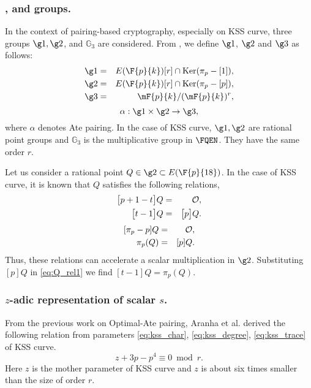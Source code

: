 \subsubsection{,  and  groups.} In the context of pairing-based cryptography, especially on KSS curve, three groups $\g1, \g2$, and $\mathbb{G}_3$ are considered. From \cite{PAIRING:MANS13}, we define $\g1$, $\g2$ and $\g3$ as follows:
\begin{eqnarray}\label{eq:g1}
\g1 & = &  E(\F{p}{k}) [r] \cap \text{Ker}(\pi_p - [1]), \nonumber \\
\g2 & = &  E(\F{p}{k}) [r] \cap \text{Ker}(\pi_p - [p]), \nonumber \\
\g3 & = & \mF{p}{k}/(\mF{p}{k})^r, \nonumber
\end{eqnarray}
\begin{equation}
\alpha : \g1 \times \g2 \rightarrow \g3,
\end{equation}
where $\alpha$ denotes Ate pairing. In the case of KSS curve, $\g1, \g2$ are rational point groups and $\mathbb{G}_3$ is the multiplicative group in $\FQEN$. They have the same order $r$. 

Let us consider a rational point $Q\in \g2 \subset E(\F{p}{18})$.
In the case of KSS curve, it is known that $Q$ satisfies the following relations,
\begin{eqnarray}\label{eq:Q_rel1}
\big[p+1-t\big]Q & = & \cal O, \nonumber \\
\big[t-1\big]Q  & = & \big[p\big]Q.
\end{eqnarray}
\begin{eqnarray}\label{eq:Q_rel2}
[\pi_p -p]Q & = &\cal O, \nonumber \\
\pi_p(Q) & = & [p]Q.
\end{eqnarray}
Thus, these relations can accelerate a scalar multiplication in $\g2$.
Substituting $[p]Q$ in \eqref{eq:Q_rel1} we find $[t-1]Q = \pi_p(Q)$.

\subsubsection{$z$-adic representation of scalar $s$.}
From the previous work on Optimal-Ate pairing, Aranha et al. \cite{PAIRING:AFKMR12} derived the following relation from parameters \eqref{eq:kss_char}, \eqref{eq:kss_degree}, \eqref{eq:kss_trace} of KSS curve.
\begin{equation}\label{eq:aranha_relation}
z+3p-p^4 \equiv 0 \bmod {r}.
\end{equation}
Here $z$ is the mother parameter of KSS curve and $z$ is about six times smaller than the size of order $r$. 

